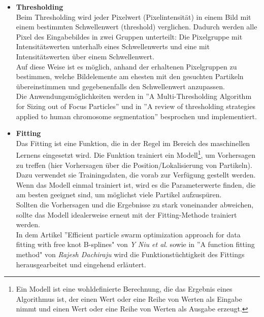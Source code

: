 \begin{itemize}
\item \textbf{Thresholding}\\
Beim Thresholding wird jeder Pixelwert (Pixelintensität) in einem Bild mit einem bestimmten Schwellenwert (threshold) verglichen. Dadurch werden alle Pixel des Eingabebildes in zwei Gruppen unterteilt: Die Pixelgruppe mit Intensitätswerten unterhalb eines Schwellenwerts und eine mit Intensitätswerten über einem Schwellenwert.\\
Auf diese Weise ist es möglich, anhand der erhaltenen Pixelgruppen zu bestimmen, welche Bildelemente am ehesten mit den gesuchten Partikeln übereinstimmen und gegebenenfalls den Schwellenwert anzupassen.\\
Die Anwendungsmöglichkeiten werden in ''A Multi-Thresholding Algorithm for Sizing out of Focus Particles'' \cite{ju2012multi} und in ''A review of thresholding strategies applied to human chromosome segmentation'' \cite{poletti2012review} besprochen und implementiert.


\item \textbf{Fitting}\\
Das Fitting ist eine Funktion, die in der Regel im Bereich des maschinellen Lernens eingesetzt wird. Die Funktion trainiert ein Modell\footnote{Ein Modell ist eine wohldefinierte Berechnung, die das Ergebnis eines Algorithmus ist, der einen Wert oder eine Reihe von Werten als Eingabe nimmt und einen Wert oder eine Reihe von Werten als Ausgabe erzeugt.}, um Vorhersagen zu treffen (hier Vorhersagen über die Position/Lokalisierung von Partikeln). Dazu verwendet sie Trainingsdaten, die vorab zur Verfügung gestellt werden. Wenn das Modell einmal trainiert ist, wird es die Parameterwerte finden, die am besten geeignet sind, um möglichst viele Partikel aufzuspüren.\\ 
Sollten die Vorhersagen und die Ergebnisse zu stark voneinander abweichen, sollte das Modell idealerweise erneut mit der Fitting-Methode trainiert werden.\\
In dem Artikel ''Efficient particle swarm optimization approach for data fitting with free knot B-splines" \cite{galvez2011efficient} von \textit{Y Niu et al}. sowie in ''A function fitting method" \cite{Dachiraju+2020+59+65} von \textit{Rajesh Dachiraju} wird die Funktionstüchtigkeit des Fittings herausgearbeitet und eingehend erläutert.


\end{itemize}
